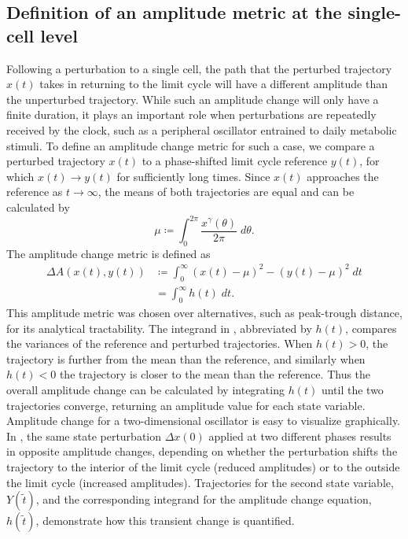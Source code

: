 \subsection{Definition of an amplitude metric at the single-cell level}

Following a perturbation to a single cell, the path that the perturbed trajectory $x(t)$ takes in returning to the limit cycle will have a different amplitude than the unperturbed trajectory.
While such an amplitude change will only have a finite duration, it plays an important role when perturbations are repeatedly received by the clock, such as a peripheral oscillator entrained to daily metabolic stimuli.
To define an amplitude change metric for such a case, we compare a perturbed trajectory $x(t)$ to a phase-shifted limit cycle reference $y(t)$, for which $x(t) \to y(t)$ for sufficiently long times.
Since $x(t)$ approaches the reference as $t \to \infty$, the means of both trajectories are equal and can be calculated by
\begin{equation}
  \mu \coloneqq \int_0^{2\pi} \frac{x^\gamma(\theta)}{2\pi} \; d\theta.
  \label{eq:mu}
\end{equation}
The amplitude change metric is defined as
\begin{equation}
  \begin{aligned}
    \Delta A (x(t), y(t)) &\coloneqq \int_0^\infty (x(t) - \mu)^2 - (y(t) - \mu)^2 \; dt\\
    &= \int_0^\infty h(t) \; dt.
  \end{aligned}
  \label{eq:ampchangedefinition}
\end{equation}
This amplitude metric was chosen over alternatives, such as peak-trough distance, for its analytical tractability.
The integrand in , abbreviated by $h(t)$, compares the variances of the reference and perturbed trajectories.
When $h(t) > 0$, the trajectory is further from the mean than the reference, and similarly when $h(t) < 0$ the trajectory is closer to the mean than the reference.
Thus the overall amplitude change can be calculated by integrating $h(t)$ until the two trajectories converge, returning an amplitude value for each state variable.
Amplitude change for a two-dimensional oscillator is easy to visualize graphically.
In , the same state perturbation $\Delta x(0)$ applied at two different phases results in opposite amplitude changes, depending on whether the perturbation shifts the trajectory to the interior of the limit cycle (reduced amplitudes) or to the outside the limit cycle (increased amplitudes).
Trajectories for the second state variable, $Y(\tilde{t})$, and the corresponding integrand for the amplitude change equation, $h(\tilde{t})$, demonstrate how this transient change is quantified.

